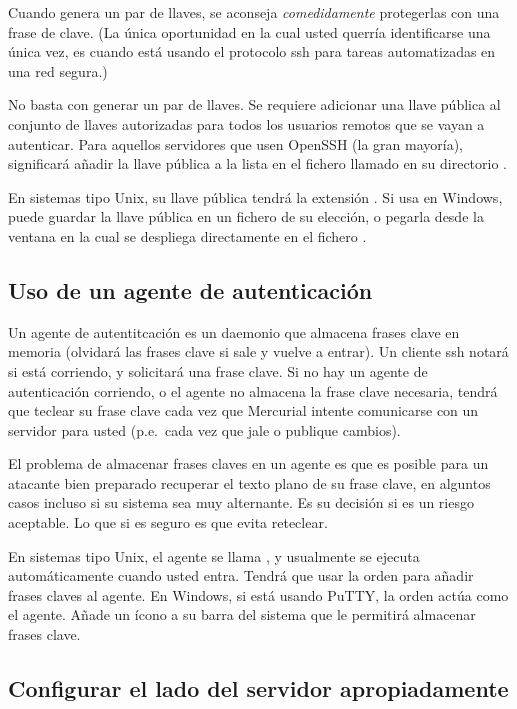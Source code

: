 Cuando genera un par de llaves, se aconseja \emph{comedidamente} 
protegerlas con una frase de clave.  (La única oportunidad en la cual
usted querría identificarse una única vez, es cuando está usando
el protocolo ssh para tareas automatizadas en una red segura.)

No basta con generar un par de llaves.  Se requiere adicionar una llave
pública al conjunto de llaves autorizadas para todos los usuarios
remotos que se vayan a autenticar.  Para aquellos servidores que usen
OpenSSH (la gran mayoría), significará añadir la llave pública a la
lista en el fichero llamado  en su
directorio .

En sistemas tipo Unix, su llave pública tendrá la extensión
.  Si usa  en Windows, puede
guardar la llave pública en un fichero de su elección, o pegarla desde
la ventana en la cual se despliega directamente en el fichero
.

\subsection{Uso de un agente de autenticación}

Un agente de autentitcación es un daemonio que almacena frases clave en
memoria (olvidará las frases clave si sale y vuelve a entrar).  Un cliente
ssh notará si está corriendo, y solicitará una frase clave.  Si no hay
un agente de autenticación corriendo, o el agente no almacena la frase
clave necesaria, tendrá que teclear su frase clave cada vez que 
Mercurial intente comunicarse con un servidor para usted (p.e.~cada vez
que jale o publique cambios).

El problema de almacenar frases claves en un agente es que es posible
para un atacante bien preparado recuperar el texto plano de su frase
clave, en alguntos casos incluso si su sistema sea muy alternante.
Es su decisión si es un riesgo aceptable.  Lo que si es seguro es que
evita reteclear.

En sistemas tipo Unix, el agente se llama , y
usualmente se ejecuta automáticamente cuando usted entra.  Tendrá que
usar la orden  para añadir frases claves al agente.  En
Windows, si está usando PuTTY, la orden  actúa como
el agente.  Añade un ícono a su barra del sistema que le permitirá
almacenar frases clave.

\subsection{Configurar el lado del servidor apropiadamente}

